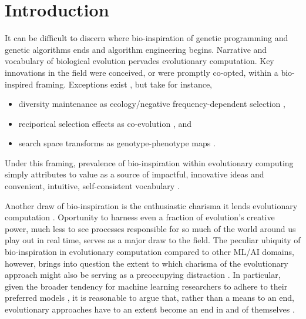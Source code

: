 \section{Introduction} \label{sec:introduction}

It can be difficult to discern where bio-inspiration of genetic programming and genetic algorithms ends and algorithm engineering begins.
Narrative and vocabulary of biological evolution pervades evolutionary computation.
Key innovations in the field were conceived, or were promptly co-opted, within a bio-inspired framing.
Exceptions exist \citep{TODO}, but take for instance,
\begin{itemize}
  \item diversity maintenance as ecology/negative frequency-dependent selection \citep{TODO},
  \item reciporical selection effects as co-evolution \citep{TODO}, and
  \item search space transforms as genotype-phenotype maps \citep{TODO}.
\end{itemize}
Under this framing, prevalence of bio-inspiration within evolutionary computing simply attributes to value as a source of impactful, innovative ideas and convenient, intuitive, self-consistent vocabulary \citep{sorensen2015metaheuristics,banzhaf2006artificial}.


Another draw of bio-inspiration is the enthusiastic charisma it lends evolutionary computation \citep{lehman2020surprising}.
Oportunity to harness even a fraction of evolution's creative power, much less to see processes responsible for so much of the world around us play out in real time, serves as a major draw to the field.
The peculiar ubiquity of bio-inspiration in evolutionary computation compared to other ML/AI domains, however, brings into question the extent to which charisma of the evolutionary approach might also be serving as a preoccupying distraction \citep{moore2023evolution,sorensen2015metaheuristics}.
In particular, given the broader tendency for machine learning researchers to adhere to their preferred models \citep{domingos2012few}, it is reasonable to argue that, rather than a means to an end, evolutionary approaches have to an extent become an end in and of themselves \citep{woodward2016gp,yampolskiy2018we}.

